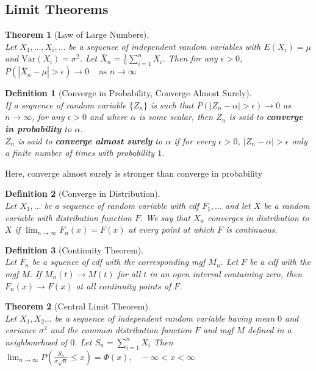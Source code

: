 \documentclass[12pt]{article}
\newcommand{\var}{\mathrm{Var}}
\newtheorem{definition}{Definition}[section]
\newtheorem{theorem}{Theorem}[section]
\theoremstyle{definition}
\begin{document}
\subsection{Limit Theorems}
\begin{theorem}[Law of Large Numbers]
\hfill\\\normalfont Let $X_1,\ldots, X_i,\ldots$ be a sequence of independent random variables with $E(X_i)=\mu$ and $\var(X_i)=\sigma^2$. Let $\bar{X}_n = \frac{1}{n}\sum_{i=1}^n X_i$. Then for any $\epsilon>0$,
$
P(|\bar{X}_n-\mu|>\epsilon)\to 0\;\;\;\text{ as }n\to \infty
$
\end{theorem}
\begin{definition}[Converge in Probability, Converge Almost Surely]
\hfill\\\normalfont If a sequence of random variable $\{Z_n\}$ is such that $P(|Z_n-\alpha|>\epsilon)\to 0$ as $n\to \infty$, for any $\epsilon>0$ and where $\alpha$ is some scalar, then $Z_n$ is said to \textbf{converge in probability} to $\alpha$.\\

$Z_n$ is said to \textbf{converge almost surely} to $\alpha$ if for every $\epsilon>0$, $|Z_n-\alpha|>\epsilon$ only a finite number of times with probability $1$.
\end{definition}
Here, converge almost surely is stronger than converge in probability
\begin{definition}[Converge in Distribution]
\hfill\\\normalfont Let $X_1,\ldots$ be a sequence of random variable with cdf $F_1,\ldots$ and let $X$ be a random variable with distribution function $F$. We say that $X_n$ converges in distribution to $X$ if
$
\lim_{n\to \infty} F_n(x) = F(x)
$
at every point at which $F$ is continuous.
\end{definition}
\begin{definition}[Continuity Theorem]
\hfill\\\normalfont Let $F_n$ be a squence of cdf with the corresponding mgf $M_n$. Let $F$ be a cdf with the mgf $M$. If $M_n(t)\to M(t)$ for all $t$ in an open interval containing zero, then $F_n(x)\to F(x)$ at all continuity points of $F$.
\end{definition}
\begin{theorem}[Central Limit Theorem]
\hfill\\\normalfont Let $X_1, X_2\ldots$ be a sequence of independent random variable having mean $0$ and variance $\sigma^2$ and the common distribution function $F$ and mgf $M$ defined in a neighbourhood of $0$. Let
$
S_n = \sum_{i=1}^n X_i
$
Then
$
\lim_{n\to \infty} P(\frac{S_n}{\sigma \sqrt{n}}\leq x)=\Phi(x),\;\;\;-\infty<x<\infty
$
\end{theorem}
\end{document}
